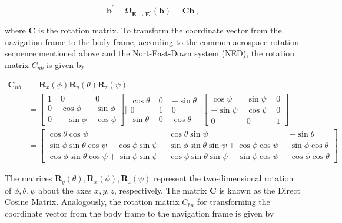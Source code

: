\begin{equation}
  \mathbf{b^{'}} = \mathbf{\Omega}_{\mathbf{E} \rightarrow \mathbf{E}^{'}}(\mathbf{b}) = \mathbf{C} \mathbf{b}\,,
\end{equation}

\noindent
where $\mathbf{C}$ is the rotation matrix. To transform the coordinate vector from the navigation frame to the body frame, according to the common aerospace rotation sequence mentioned above and the Nort-East-Down system (NED), the rotation matrix $C_{nb}$ is given by

\begin{equation}
\begin{split}
\mathbf{C}_{nb} & = \mathbf{R}_x(\phi) \mathbf{R}_y(\theta) \mathbf{R}_z(\psi) \\
 & = {\left[ \begin{smallmatrix}
    1 \; & 0 \; & 0 \\
    0 \; & \cos \phi \; & \sin \phi \\
    0 \; & -\sin \phi \; & \cos \phi
    \end{smallmatrix}\right]}
    {\bigg[ \begin{smallmatrix}
    \cos \theta \; & 0 \; & -\sin \theta \\
    0 \; & 1 \; & 0 \\
    \sin \theta \; & 0 \; & \cos \theta
    \end{smallmatrix} \bigg]}
    {\left[\begin{smallmatrix}
    \cos \psi \; & \sin \psi \; & 0 \\
    -\sin \psi \; & \cos \psi \; & 0 \\
    0 \; & 0 \; & 1
    \end{smallmatrix}\right]}\\
 & = {\left[\begin{smallmatrix}
   \cos \theta \cos \psi \; &
    \cos \theta \sin \psi \; &
   -\sin \theta \\
    \sin \phi \sin \theta \cos \psi - \cos \phi \sin \psi \;\; &
    \sin \phi \sin \theta \sin \psi + \cos \phi \cos \psi \;\; &
    \sin \phi \cos \theta \\
    \cos \phi \sin \theta \cos \psi + \sin \phi \sin \psi \;\; &
    \cos \phi \sin \theta \sin \psi - \sin \phi \cos \psi \;\; &
    \cos \phi \cos \theta
  \end{smallmatrix}\right]}
\end{split}
\end{equation}

\noindent
The matrices $\mathbf{R}_y(\theta), \mathbf{R}_x(\phi), \mathbf{R}_z(\psi)$ represent the two-dimensional rotation of $\phi, \theta, \psi$ about the axes $x, y, z$, respectively. The matrix $\mathbf{C}$ is known as the Direct Cosine Matrix. Analogously, the rotation matrix $C_{bn}$ for transforming the coordinate vector from the body frame to the navigation frame is given by

